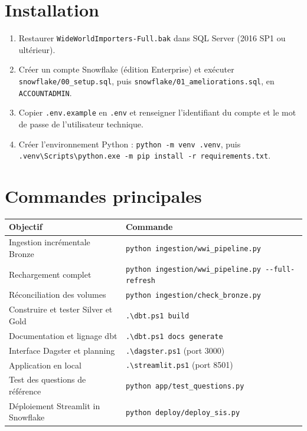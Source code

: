 \section*{Installation}
\begin{enumerate}
  \item Restaurer \texttt{WideWorldImporters-Full.bak} dans SQL Server (2016 SP1 ou ultérieur).
  \item Créer un compte Snowflake (édition Enterprise) et exécuter \texttt{snowflake/00\_setup.sql},
        puis \texttt{snowflake/01\_ameliorations.sql}, en \texttt{ACCOUNTADMIN}.
  \item Copier \texttt{.env.example} en \texttt{.env} et renseigner l'identifiant du compte et le mot de
        passe de l'utilisateur technique.
  \item Créer l'environnement Python : \texttt{python -m venv .venv}, puis
        \texttt{.venv\textbackslash Scripts\textbackslash python.exe -m pip install -r requirements.txt}.
\end{enumerate}

\section*{Commandes principales}
\begin{table}[H]
\centering
\small
\begin{tabularx}{\linewidth}{@{}X l@{}}
\toprule
\textbf{Objectif} & \textbf{Commande} \\
\midrule
Ingestion incrémentale Bronze & \texttt{python ingestion/wwi\_pipeline.py} \\
Rechargement complet & \texttt{python ingestion/wwi\_pipeline.py -{}-full-refresh} \\
Réconciliation des volumes & \texttt{python ingestion/check\_bronze.py} \\
Construire et tester Silver et Gold & \texttt{.\textbackslash dbt.ps1 build} \\
Documentation et lignage dbt & \texttt{.\textbackslash dbt.ps1 docs generate} \\
Interface Dagster et planning & \texttt{.\textbackslash dagster.ps1} (port 3000) \\
Application en local & \texttt{.\textbackslash streamlit.ps1} (port 8501) \\
Test des questions de référence & \texttt{python app/test\_questions.py} \\
Déploiement Streamlit in Snowflake & \texttt{python deploy/deploy\_sis.py} \\
\bottomrule
\end{tabularx}
\end{table}

